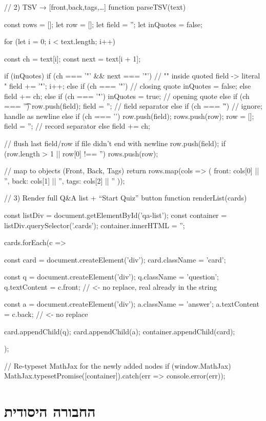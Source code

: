 \documentclass{tstextbook}
\begin{document}
    // 2) TSV → [{front,back,tags},…]
    function parseTSV(text) {
  const rows = [];
  let row = [];
  let field = '';
  let inQuotes = false;

  for (let i = 0; i < text.length; i++) {
    const ch = text[i];
    const next = text[i + 1];

    if (inQuotes) {
      if (ch === '"' && next === '"') {
        // "" inside quoted field -> literal "
        field += '"';
        i++;
      } else if (ch === '"') {
        // closing quote
        inQuotes = false;
      } else {
        field += ch;
      }
    } else {
      if (ch === '"') {
        inQuotes = true;                // opening quote
      } else if (ch === '\t') {
        row.push(field); field = '';    // field separator
      } else if (ch === '\r') {
        // ignore; handle \n as newline
      } else if (ch === '\n') {
        row.push(field); rows.push(row);
        row = []; field = '';           // record separator
      } else {
        field += ch;
      }
    }
  }
  // flush last field/row if file didn't end with newline
  row.push(field);
  if (row.length > 1 || row[0] !== '') rows.push(row);

  // map to objects (Front, Back, Tags)
  return rows.map(cols => ({
    front: cols[0] || '',
    back:  cols[1] || '',
    tags:  cols[2] || ''
  }));
}
// 3) Render full Q&A list + “Start Quiz” button
function renderList(cards) {
  const listDiv = document.getElementById('qa-list');
  const container = listDiv.querySelector('.cards');
  container.innerHTML = '';

  cards.forEach(c => {
    const card = document.createElement('div');
    card.className = 'card';

    const q = document.createElement('div');
    q.className = 'question';
    q.textContent = c.front;   // <- no replace, real \n already in the string

    const a = document.createElement('div');
    a.className = 'answer';
    a.textContent = c.back;    // <- no replace

    card.appendChild(q);
    card.appendChild(a);
    container.appendChild(card);
  });

  // Re-typeset MathJax for the newly added nodes
  if (window.MathJax) {
    MathJax.typesetPromise([container]).catch(err => console.error(err));
  }
}
  \chapter{החבורה היסודית}
\end{document}
